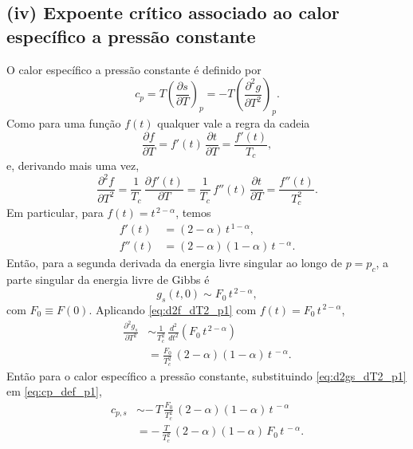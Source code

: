 \documentclass[11pt,a4paper]{article}
\begin{document}
\subsection*{(iv) Expoente crítico associado ao calor específico a pressão constante}
%
O calor específico a pressão constante é definido por
%
\begin{equation}
    c_p
    =T\left(\frac{\partial s}{\partial T}\right)_p
    =-T\left(\frac{\partial^2 g}{\partial T^2}\right)_p.
    \label{eq:cp_def_p1}
\end{equation}
%
Como para uma função \(f(t)\) qualquer vale a regra da cadeia
%
\begin{equation}
    \frac{\partial f}{\partial T}
    =
    f'(t)\,\frac{\partial t}{\partial T}
    =
    \frac{f'(t)}{T_c},
    \label{eq:df_dT_p1}
\end{equation}
%
e, derivando mais uma vez,
%
\begin{equation}
    \frac{\partial^2 f}{\partial T^2}
    =
    \frac{1}{T_c}\,
    \frac{\partial f'(t)}{\partial T}
    =
    \frac{1}{T_c}\,
    f''(t)\,\frac{\partial t}{\partial T}
    =
    \frac{f''(t)}{T_c^{2}}.
    \label{eq:d2f_dT2_p1}
\end{equation}
%
Em particular, para \(f(t)=t^{\,2-\alpha}\), temos
%
\begin{align}
    f'(t)
    &=
    (2-\alpha)\,t^{\,1-\alpha},
    \label{eq:f1_p1}\\
    f''(t)
    &=
    (2-\alpha)(1-\alpha)\,t^{\,-\alpha}.
    \label{eq:f2_p1}
\end{align}
%
Então, para a segunda derivada da energia livre singular ao longo de \(p=p_c\), a parte singular da energia livre de Gibbs é
%
\begin{equation}
    g_s(t,0)\sim F_0\,t^{\,2-\alpha},
    \label{eq:gs_pc_p1}
\end{equation}
%
com \(F_0\equiv F(0)\). Aplicando \eqref{eq:d2f_dT2_p1} com
\(f(t)=F_0\,t^{\,2-\alpha}\),
%
\begin{align}
    \frac{\partial^2 g_s}{\partial T^2}
    &\sim
    \frac{1}{T_c^{2}}\,
    \frac{d^{2}}{dt^{2}}
    \left(F_0\,t^{\,2-\alpha}\right) \nonumber\\
    &=
    \frac{F_0}{T_c^{2}}\,
    (2-\alpha)(1-\alpha)\,
    t^{\,-\alpha}.
    \label{eq:d2gs_dT2_p1}
\end{align}
%
Então para o calor específico a pressão constante, substituindo \eqref{eq:d2gs_dT2_p1} em \eqref{eq:cp_def_p1},
%
\begin{align}
    c_{p,s}
    &\sim
    -\,T\,
    \frac{F_0}{T_c^{2}}\,
    (2-\alpha)(1-\alpha)\,
    t^{\,-\alpha} \nonumber\\
    &=
    -\,
    \frac{T}{T_c^{2}}\,
    (2-\alpha)(1-\alpha)\,F_0\,
    t^{\,-\alpha}.
    \label{eq:cps_prefator_p1}
\end{align}
\end{document}
